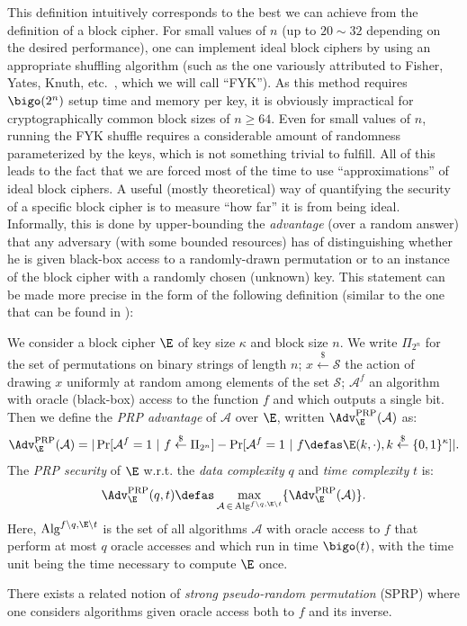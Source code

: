 This definition intuitively corresponds to the best we can achieve from the definition of a block cipher. For small values of $n$
(\eg up to $20 \sim 32$ depending on the desired performance), one can implement ideal block ciphers by using an appropriate
shuffling algorithm (such as the one variously attributed to Fisher, Yates, Knuth, etc.~\cite{uniform_shuffle}, which we will
call ``FYK''). As this method
requires $\bigo(2^n)$ setup time and memory per key, it is obviously impractical for cryptographically common block sizes of $n \geq 64$.
Even for small values of $n$, running the FYK shuffle requires a considerable amount of randomness parameterized by the keys, which
is not something trivial to fulfill. All of this leads to the fact that we are forced most of the time to use ``approximations'' of
ideal block ciphers. A useful (mostly theoretical) way of quantifying the security of a specific block cipher is to measure ``how far'' it
is from being ideal. Informally, this is done by upper-bounding the \emph{advantage} (over a random answer) that any adversary
(with some bounded resources)
has of distinguishing whether he is given black-box access to a randomly-drawn permutation or to an instance of the block cipher
with a randomly chosen (unknown) key. This statement can be made more precise in the form of the following definition
(similar to the one that can be found \eg in \cite{DBLP:journals/jcss/BellareKR00}):

\begin{defi}
We consider a block cipher $\E$ of key size $\kappa$ and block size $n$.
We write $\Pi_{2^n}$ for the set of permutations on binary strings of length $n$; $x \overset{\$}{\leftarrow} \mathcal{S}$
the action of drawing $x$ uniformly at random among elements of the set $\mathcal{S}$; $\mathcal{A}^{f}$ an algorithm with
oracle (black-box) access to the function $f$ and which outputs a single bit.
Then we define the \emph{PRP advantage} of $\mathcal{A}$ over $\E$, written $\Adv^{\text{PRP}}_{\E}(\mathcal{A})$ as:
\[
\Adv^{\text{PRP}}_{\E}(\mathcal{A}) = |\Pr[\mathcal{A}^f = 1~|~f \overset{\$}{\leftarrow} \Pi_{2^n}] - \Pr[\mathcal{A}^f = 1~|~f \defas \E(k,\cdot), k \overset{\$}{\leftarrow} \{0,1\}^\kappa]|.
\]
The \emph{PRP security} of $\E$ w.r.t. the \emph{data complexity} $q$ and \emph{time complexity} $t$ is:
\[
\Adv^{\text{PRP}}_{\E}(q,t) \defas \max_{\mathcal{A}\,\in\,\text{Alg}^{f\backslash q, \E\backslash t}} \{\Adv^{\text{PRP}}_{\E}(\mathcal{A})\}.
\]
Here, $\text{Alg}^{f\backslash q, \E\backslash t}$ is the set of all algorithms $\mathcal{A}$ with oracle access to $f$ that perform at most $q$ oracle accesses
and which run in time $\bigo(t)$, with the time unit being the time necessary to compute $\E$ once.
\end{defi}
There exists a related notion of \emph{strong pseudo-random permutation} (SPRP) where one considers algorithms given oracle access both to $f$ and its inverse.


